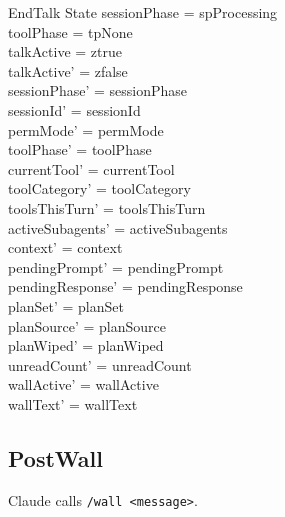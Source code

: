 \documentclass[a4paper,10pt,fleqn]{article}
\begin{document}
\begin{schema}{EndTalk}
  \Delta State
  \where
  sessionPhase = spProcessing \\
  toolPhase = tpNone \\
  talkActive = ztrue \\
  talkActive' = zfalse \\
  sessionPhase' = sessionPhase \\
  sessionId' = sessionId \\
  permMode' = permMode \\
  toolPhase' = toolPhase \\
  currentTool' = currentTool \\
  toolCategory' = toolCategory \\
  toolsThisTurn' = toolsThisTurn \\
  activeSubagents' = activeSubagents \\
  context' = context \\
  pendingPrompt' = pendingPrompt \\
  pendingResponse' = pendingResponse \\
  planSet' = planSet \\
  planSource' = planSource \\
  planWiped' = planWiped \\
  unreadCount' = unreadCount \\
  wallActive' = wallActive \\
  wallText' = wallText
\end{schema}

\subsection{PostWall}

Claude calls \texttt{/wall <message>}.
\end{document}

